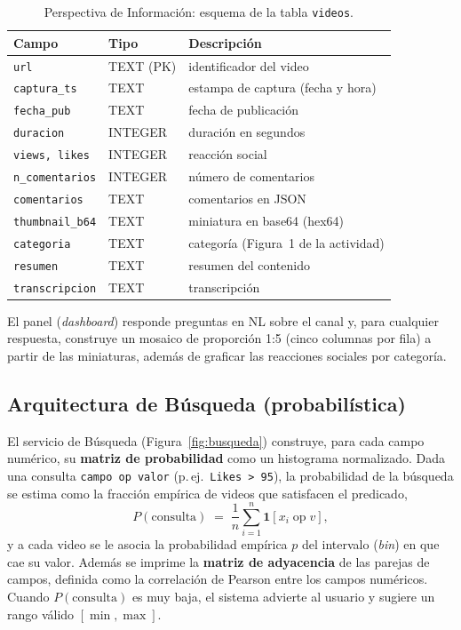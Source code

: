 \documentclass[11pt]{article}
\begin{document}
\begin{table}[H]
  \centering
  \caption{Perspectiva de Informaci\'on: esquema de la tabla \texttt{videos}.}
  \label{tab:esquema}
  \begin{tabular}{@{}lll@{}}
    \toprule
    Campo & Tipo & Descripci\'on \\
    \midrule
    \texttt{url}           & TEXT (PK) & identificador del video \\
    \texttt{captura\_ts}   & TEXT & estampa de captura (fecha y hora) \\
    \texttt{fecha\_pub}    & TEXT & fecha de publicaci\'on \\
    \texttt{duracion}      & INTEGER & duraci\'on en segundos \\
    \texttt{views, likes}  & INTEGER & reacci\'on social \\
    \texttt{n\_comentarios}& INTEGER & n\'umero de comentarios \\
    \texttt{comentarios}   & TEXT & comentarios en \ac{JSON} \\
    \texttt{thumbnail\_b64}& TEXT & miniatura en base64 (hex64) \\
    \texttt{categoria}     & TEXT & categor\'ia (Figura~1 de la actividad) \\
    \texttt{resumen}       & TEXT & resumen del contenido \\
    \texttt{transcripcion} & TEXT & transcripci\'on \\
    \bottomrule
  \end{tabular}
\end{table}

El panel (\emph{dashboard}) responde preguntas en \ac{NL} sobre el canal y, para
cualquier respuesta, construye un mosaico de proporci\'on 1:5 (cinco columnas
por fila) a partir de las miniaturas, adem\'as de graficar las reacciones
sociales por categor\'ia.

\subsection{Arquitectura de B\'usqueda (probabil\'istica)}\label{ssec:busqueda}

El servicio de B\'usqueda (Figura~\ref{fig:busqueda}) construye, para cada campo
num\'erico, su \textbf{matriz de probabilidad} como un histograma normalizado.
Dada una consulta \texttt{campo op valor} (p.\,ej.\ \texttt{Likes > 95}), la
probabilidad de la b\'usqueda se estima como la fracci\'on emp\'irica de videos
que satisfacen el predicado,
\[
  P(\text{consulta}) \;=\; \frac{1}{n}\sum_{i=1}^{n}\mathbf{1}\!\left[x_i \;\text{op}\; v\right],
\]
y a cada video se le asocia la probabilidad emp\'irica $p$ del intervalo
(\emph{bin}) en que cae su valor. Adem\'as se imprime la \textbf{matriz de
adyacencia} de las parejas de campos, definida como la correlaci\'on de Pearson
entre los campos num\'ericos. Cuando $P(\text{consulta})$ es muy baja, el
sistema advierte al usuario y sugiere un rango v\'alido $[\min,\max]$.
\end{document}
